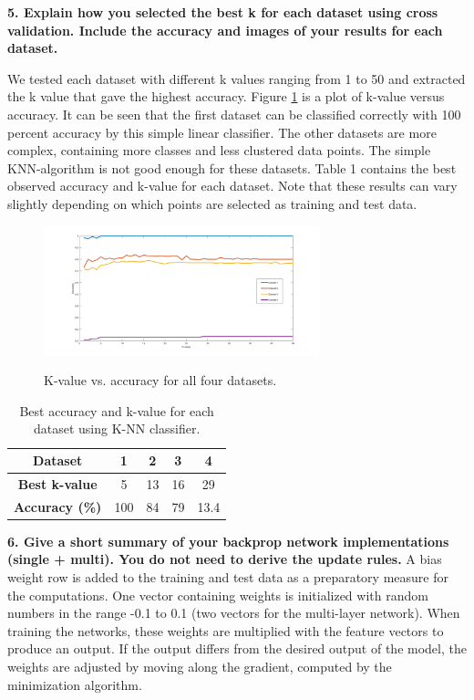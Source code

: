 \documentclass[twocolumn]{report}
\begin{document}
	\textbf{5. Explain how you selected the best k for each dataset using cross validation. Include the accuracy and images of your results for each dataset.}
	
	We tested each dataset with different k values ranging from 1 to 50 and extracted the k value that gave the highest accuracy. Figure \ref{img:accuracy} is a plot of k-value versus accuracy. It can be seen that the first dataset can be classified correctly with 100 percent accuracy by this simple linear classifier. The other datasets are more complex, containing more classes and less clustered data points. The simple KNN-algorithm is not good enough for these datasets. Table 1 contains the best observed accuracy and k-value for each dataset. Note that these results can vary slightly depending on which points are selected as training and test data.  
	
	\begin{figure}
		\includegraphics[width=8cm]{../accuracy2.png}
		\label{img:accuracy}
		\caption{K-value vs. accuracy for all four datasets.}
	\end{figure}
	
	\begin{table}
		\caption{Best accuracy and k-value for each dataset using K-NN classifier.}
		\centering
		\label{}
		\begin{tabular}{c|c|c|c|c}
			\hline
			\textbf{Dataset} & 1 & 2 & 3 & 4\\
			\hline
			\textbf{Best k-value} & 5 & 13 & 16 & 29\\
			\hline
			\textbf{Accuracy (\%)} & 100 & 84 & 79 & 13.4\\
			\hline
		\end{tabular} 
	\end{table}
	
	\textbf{6. Give a short summary of your backprop network implementations (single + multi). You do not need to derive the update rules.}
	A bias weight row is added to the training and test data as a preparatory measure for the computations. One vector containing weights is initialized with random numbers in the range -0.1 to 0.1 (two vectors for the multi-layer network). When training the networks, these weights are multiplied with the feature vectors to produce an output. If the output differs from the desired output of the model, the weights are adjusted by moving along the gradient, computed by the minimization algorithm. \\
	
\end{document}
